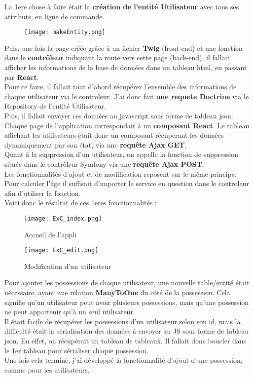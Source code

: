 La 1ere chose à faire était la \textbf{création de l'entité Utilisateur} avec tous ses attributs, en ligne de commande.
\begin{figure}[H]
    \texttt{[image: makeEntity.png]}
\end{figure}


Puis, une fois la page créée grâce à un fichier \textbf{Twig} (front-end) et une fonction dans le \textbf{contrôleur} indiquant la route vers cette page (back-end), il fallait afficher les informations de la base de données dans un tableau html, en passant par \textbf{React}.\\
Pour ce faire, il fallait tout d'abord récupérer l'ensemble des informations de chaque utilisateur via le controleur. J'ai donc fait \textbf{une requete Doctrine} via le Repository de l'entité Utilisateur.
\\Puis, il fallait envoyer ces données au javascript sous forme de tableau json. Chaque page de l'application correspondait à un \textbf{composant React}. 
Le tableau affichant les utilisateurs était donc un composant récupérant les données dynamiquement par son état, via une \textbf{requête Ajax GET}.\\
Quant à la suppression d'un utilisateur, on appelle la fonction de suppression située dans le contrôleur Symfony via une \textbf{requête Ajax POST}.\\
Les fonctionnalités d'ajout et de modification reposent sur le même principe.\\
Pour calculer l'âge il suffisait d'importer le service en question dans le controleur afin d'utiliser la fonction.\\
Voici donc le résultat de ces 1eres fonctionnalités :

\begin{figure}[H]
    \centering
    \texttt{[image: ExC\_index.png]}
    \caption{Accueil de l'appli}
\end{figure}

\begin{figure}[H]
    \centering
    \texttt{[image: ExC\_edit.png]}
    \caption{Modification d'un utilisateur}
\end{figure}



Pour ajouter les possessions de chaque utilisateur, une nouvelle table/entité était nécessaire, ayant une relation \textbf{ManyToOne} du côté de la possession. 
Cela signifie qu'un utilisateur peut avoir plusieurs possessions, mais qu'une possession ne peut appartenir qu'à un seul utilisateur. \\
Il était facile de récupérer les possessions d'un utilisateur selon son id, mais la difficulté était la sérialisation des données à envoyer au JS sous forme de tableau json.
En effet, on récupérait un tableau de tableaux. Il fallait donc boucler dans le 1er tableau pour sérialiser chaque possession.\\
Une fois cela terminé, j'ai développé la fonctionnalité d'ajout d'une possession, comme pour les utilisateurs.

